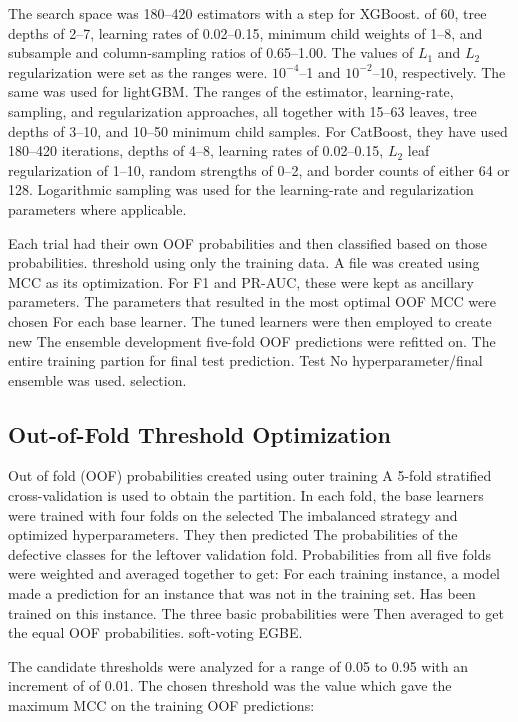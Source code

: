 \documentclass[conference]{IEEEtran}
\begin{document}
The search space was 180--420 estimators with a step for XGBoost.
of 60, tree depths of 2--7, learning rates of 0.02--0.15, minimum child
weights of 1--8, and subsample and column-sampling ratios of 0.65--1.00.
The values of \(L_1\) and \(L_2\) regularization were set as the ranges were.
\(10^{-4}\)--1 and \(10^{-2}\)--10, respectively. The same was used for lightGBM.
The ranges of the estimator, learning-rate, sampling, and regularization approaches, all together
with 15--63 leaves, tree depths of 3--10, and 10--50 minimum child
samples. For CatBoost, they have used 180--420 iterations, depths
of 4--8, learning rates of 0.02--0.15, \(L_2\) leaf regularization of
1--10, random strengths of 0--2, and border counts of either 64 or 128.
Logarithmic sampling was used for the learning-rate and regularization
parameters where applicable.

Each trial had their own OOF probabilities and then classified based on those probabilities.
threshold using only the training data. A file was created using MCC as its optimization.
For F1 and PR-AUC, these were kept as ancillary parameters.
The parameters that resulted in the most optimal OOF MCC were chosen
For each base learner. The tuned learners were then employed to create new
The ensemble development five-fold OOF predictions were refitted on.
The entire training partion for final test prediction. Test
No hyperparameter/final ensemble was used.
selection.

\subsection{Out-of-Fold Threshold Optimization}
\label{subsec:oof-threshold}

Out of fold (OOF) probabilities created using outer training
A 5-fold stratified cross-validation is used to obtain the partition. In each fold,
the base learners were trained with four folds on the selected
The imbalanced strategy and optimized hyperparameters. They then predicted
The probabilities of the defective classes for the leftover validation fold.
Probabilities from all five folds were weighted and averaged together to get:
For each training instance, a model made a prediction for an instance that was not in the training set.
Has been trained on this instance. The three basic probabilities were
Then averaged to get the equal OOF probabilities.
soft-voting EGBE.

The candidate thresholds were analyzed for a range of 0.05 to 0.95 with an increment of
of 0.01. The chosen threshold was the value which gave the maximum MCC on the
training OOF predictions:
\end{document}
